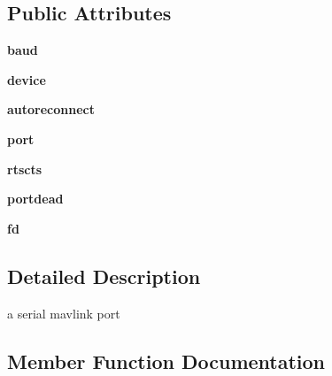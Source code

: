 \subsection*{Public Attributes}
\begin{DoxyCompactItemize}
\item 
\mbox{\label{classpymavlink_1_1mavutil_1_1mavserial_a30e81076e135f155338cdb028d634bdb}} 
{\bfseries baud}
\item 
\mbox{\label{classpymavlink_1_1mavutil_1_1mavserial_a42ee22c9edea351a8228113efb0c1907}} 
{\bfseries device}
\item 
\mbox{\label{classpymavlink_1_1mavutil_1_1mavserial_aec2ff119c2631f63d3608bd347133183}} 
{\bfseries autoreconnect}
\item 
\mbox{\label{classpymavlink_1_1mavutil_1_1mavserial_a21eb82949b5d2a8f77da9b6b07a99962}} 
{\bfseries port}
\item 
\mbox{\label{classpymavlink_1_1mavutil_1_1mavserial_af3469e2df31f9684e6603459dcae461d}} 
{\bfseries rtscts}
\item 
\mbox{\label{classpymavlink_1_1mavutil_1_1mavserial_af651e06812c51cc77cd0617615050d94}} 
{\bfseries portdead}
\item 
\mbox{\label{classpymavlink_1_1mavutil_1_1mavserial_a1a4e38937fe65a0c201ffa9f6e83d1d3}} 
{\bfseries fd}
\end{DoxyCompactItemize}


\subsection{Detailed Description}
\begin{DoxyVerb}a serial mavlink port\end{DoxyVerb}
 

\subsection{Member Function Documentation}
\mbox{\label{classpymavlink_1_1mavutil_1_1mavserial_aa69a31cb7e3cee07ec43174501cb79ac}} 
